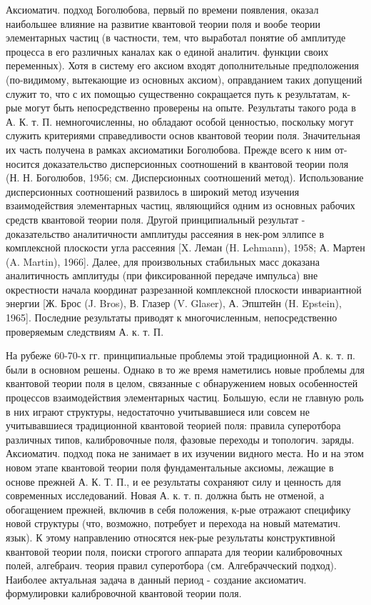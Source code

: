 \documentclass[10pt]{article}
\begin{document}
Аксиоматич. подход Боголюбова, первый по времени появления, оказал наибольшее влияние на развитие квантовой теории поля и вообе теории элементарных частиц (в частности, тем, что выработал понятие об амплитуде процесса в его различных каналах как о единой аналитич. функции своих переменных). Хотя в систему его аксиом входят дополнительные предположения (по-видимому, вытекающие из основных аксиом), оправданием таких допущений служит то, что с их помощью существенно сокращается путь к результатам, к-рые могут быть непосредственно проверены на опыте. Результаты такого рода в А. К. т. П. немногочисленны, но обладают особой ценностью, поскольку могут служить критериями справедливости основ квантовой теории поля. Значительная их часть получена в рамках аксиоматики Боголюбова. Прежде всего к ним от- носится доказательство дисперсионных соотношений в квантовой теории поля (Н. Н. Боголюбов, 1956; см. Дисперсионных соотношений метод). Использование дисперсионных соотношений развилось в широкий метод изучения взаимодействия элементарных частиц, являющийся одним из основных рабочих средств квантовой теории поля. Другой принципиальный результат - доказательство аналитичности амплитуды рассеяния в нек-ром эллипсе в комплексной плоскости угла рассеяния [X. Леман (H. Lehmann), 1958; А. Мартен (A. Martin), 1966]. Далее, для произвольных стабильных масс доказана аналитичность амплитуды (при фиксированной передаче импульса) вне окрестности начала координат разрезанной комплексной плоскости инвариантной энергии [Ж. Брос (J. Bros), В. Глазер (V. Glaser), А. Эпштейн (H. Epstein), 1965]. Последние результаты приводят к многочисленным, непосредственно проверяемым следствиям А. к. т. П.



На рубеже 60-70-х гг. принципиальные проблемы этой традиционной А. к. т. п. были в основном решены. Однако в то же время наметились новые проблемы для квантовой теории поля в целом, связанные с обнаружением новых особенностей процессов взаимодействия элементарных частиц. Большую, если не главную роль в них играют структуры, недостаточно учитывавшиеся или совсем не учитывавшиеся традиционной квантовой теорией поля: правила суперотбора различных типов, калибровочные поля, фазовые переходы и топологич. заряды. Аксиоматич. подход пока не занимает в их изучении видного места. Но и на этом новом этапе квантовой теории поля фундаментальные аксиомы, лежащие в основе прежней А. К. Т. П., и ее результаты сохраняют силу и ценность для современных исследований. Новая А. к. т. п. должна быть не отменой, а обогащением прежней, включив в себя положения, к-рые отражают специфику новой структуры (что, возможно, потребует и перехода на новый математич. язык). К этому направлению относятся нек-рые результаты конструктивной квантовой теории поля, поиски строгого аппарата для теории калибровочных полей, алгебраич. теория правил суперотбора (см. Алгебрачческий подход). Наиболее актуальная задача в данный период - создание аксиоматич. формулировки калибровочной квантовой теории поля.
\end{document}
